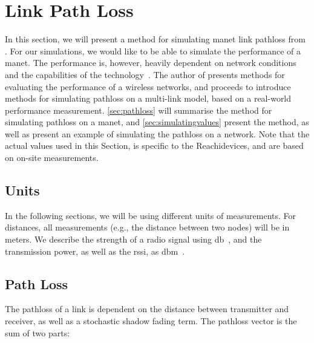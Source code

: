 \section{Link Path Loss}\label{sec:linkmodel}

In this section, we will present a method for simulating \gls{manet} link \gls{pathloss} from \cite{paper:linkmodel}. For our simulations, we would like to be able to simulate the performance of a \gls{manet}. The performance is, however, heavily dependent on network conditions and the capabilities of the technology~\cite[p.~10]{paper:linkmodel}. The author of \cite{paper:linkmodel} presents methods for evaluating the performance of a wireless networks, and proceeds to introduce methods for simulating \gls{pathloss} on a multi-link model, based on a real-world performance measurement. \autoref{sec:pathloss} will summarise the method for simulating \gls{pathloss} on a \gls{manet}, and \autoref{sec:simulatingvalues} present the method, as well as present an example of simulating the \gls{pathloss} on a network. Note that the actual values used in this Section, is specific to the Reachidevices, and are based on on-site measurements.

\subsection{Units}
In the following sections, we will be using different units of measurements. For distances, all measurements (e.g., the distance between two nodes) will be in meters. We describe the strength of a radio signal using \acrfull{db}~\cite{website:isadbdbm}, and the transmission power, as well as the \gls{rssi}, as \acrfull{dbm}~\cite{website:isadbdbm}.

\subsection{Path Loss}\label{sec:pathloss}
The \gls{pathloss} of a link is dependent on the distance between transmitter and receiver, as well as a stochastic shadow fading term. The \gls{pathloss} vector  is the sum of two parts:


